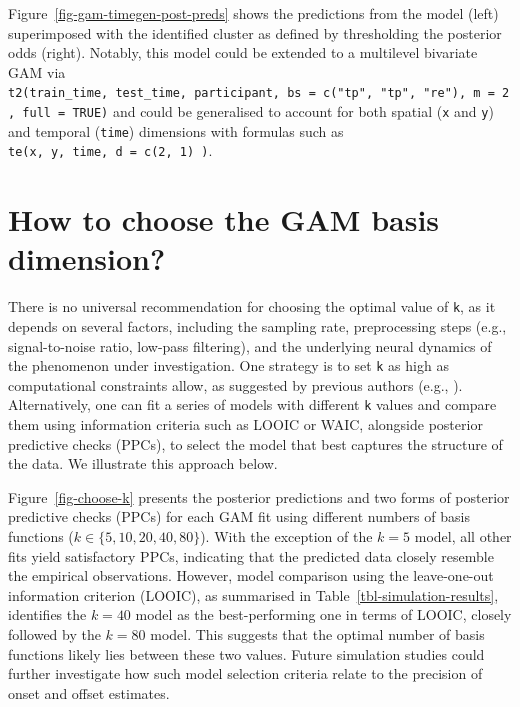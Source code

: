 \documentclass[
  doc,
  floatsintext,
  longtable,
  a4paper,
  nolmodern,
  notxfonts,
  notimes,
  colorlinks=true,linkcolor=blue,citecolor=blue,urlcolor=blue]{apa7}
\begin{document}
\setlength{\parindent}{0pt}
\setlength{\parskip}{6pt}

Figure~\ref{fig-gam-timegen-post-preds} shows the predictions from the
model (left) superimposed with the identified cluster as defined by
thresholding the posterior odds (right). Notably, this model could be
extended to a multilevel bivariate GAM via
\texttt{t2(train\_time,\ test\_time,\ participant,\ bs\ =\ c("tp",\ "tp",\ "re"),\ m\ =\ 2,\ full\ =\ TRUE)}
and could be generalised to account for both spatial (\texttt{x} and
\texttt{y}) and temporal (\texttt{time}) dimensions with formulas such
as \texttt{te(x,\ y,\ time,\ d\ =\ c(2,\ 1)\ )}.

\newpage

\section{How to choose the GAM basis dimension?}\label{apx-basis}

\setlength{\parindent}{0pt}
\setlength{\parskip}{6pt}

There is no universal recommendation for choosing the optimal value of
\texttt{k}, as it depends on several factors, including the sampling
rate, preprocessing steps (e.g., signal-to-noise ratio, low-pass
filtering), and the underlying neural dynamics of the phenomenon under
investigation. One strategy is to set \texttt{k} as high as
computational constraints allow, as suggested by previous authors (e.g.,
).
Alternatively, one can fit a series of models with different \texttt{k}
values and compare them using information criteria such as LOOIC or
WAIC, alongside posterior predictive checks (PPCs), to select the model
that best captures the structure of the data. We illustrate this
approach below.

\setlength{\parindent}{0pt}
\setlength{\parskip}{6pt}

Figure~\ref{fig-choose-k} presents the posterior predictions and two
forms of posterior predictive checks (PPCs) for each GAM fit using
different numbers of basis functions (\(k \in \{5, 10, 20, 40, 80\}\)).
With the exception of the \(k=5\) model, all other fits yield
satisfactory PPCs, indicating that the predicted data closely resemble
the empirical observations. However, model comparison using the
leave-one-out information criterion (LOOIC), as summarised in
Table~\ref{tbl-simulation-results}, identifies the \(k=40\) model as the
best-performing one in terms of LOOIC, closely followed by the \(k=80\)
model. This suggests that the optimal number of basis functions likely
lies between these two values. Future simulation studies could further
investigate how such model selection criteria relate to the precision of
onset and offset estimates.
\end{document}
